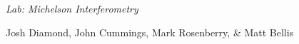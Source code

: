 {\LARGE {\em \noindent Lab: Michelson Interferometry}} 

\large{\noindent Josh Diamond, John Cummings, Mark Rosenberry, \&  Matt Bellis}


